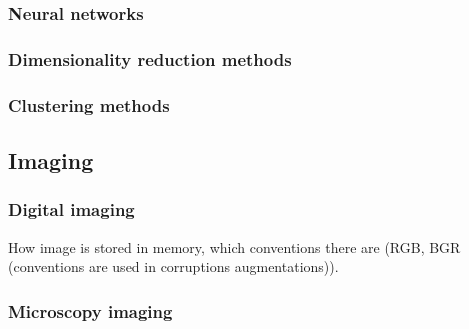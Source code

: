         \subsubsection{Neural networks}
            
        \subsubsection{Dimensionality reduction methods}
            
        \subsubsection{Clustering methods}
            
    \subsection{Imaging}
        \subsubsection{Digital imaging}
            
            How image is stored in memory, which conventions there are (RGB, BGR (conventions are used in corruptions augmentations)).
        \subsubsection{Microscopy imaging}
            